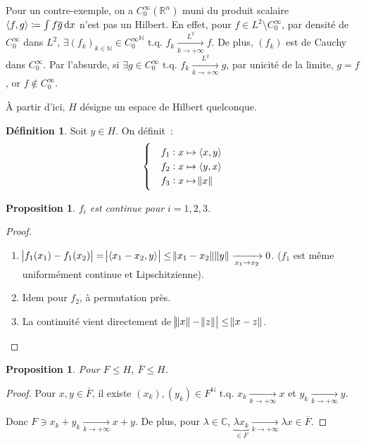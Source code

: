 \documentclass{report}
\newcommand{\C}{{\mathbb C}}
\newcommand{\R}{{\mathbb R}}
\newcommand{\N}{{\mathbb N}}
\newcommand{\scpr}[2]{\left\langle#1, #2\right\rangle}
\newcommand{\tq}{\text{ t.q. }}
\newcommand{\pinfty}{{+\infty}}
\newcommand{\dx}{\dif x}
\newtheorem{prp}[thm]{Proposition}
\theoremstyle{definition}
\newtheorem{déf}[thm]{Définition}
\theoremstyle{remark}
\begin{document}
Pour un contre-exemple, on a $C^\infty_0(\R^n)$ muni du produit scalaire $\scpr fg \coloneqq \int f\overline g\dx$ n'est pas un Hilbert. En effet, pour $f \in L^2 \setminus C^\infty_0$,
par densité de $C^\infty_0$ dans $L^2$, $\exists (f_k)_{k \in \N} \in {C^\infty_0}^\N \tq f_k \xrightarrow[k \to \pinfty]{L^2} f$. De plus, $(f_k)$ est de Cauchy dans $C^\infty_0$.
Par l'absurde, si $\exists g \in C^\infty_0 \tq f_k \xrightarrow[k \to \pinfty]{L^2} g$, par unicité de la limite, $g=f$, or $f \not \in C^\infty_0$.

À partir d'ici, $H$ désigne un espace de Hilbert quelconque.

\begin{déf} Soit $y \in H$. On définit~:
\[\begin{cases}
	&f_1 : x \mapsto \scpr xy \\
	&f_2 : x \mapsto \scpr yx \\
	&f_3 : x \mapsto \norm x
\end{cases}\]
\end{déf}

\begin{prp} $f_i$ est continue pour $i=1,2,3$.
\end{prp}

\begin{proof}
\begin{enumerate}
	\item $\abs {f_1(x_1) - f_1(x_2)} = \abs {\scpr {x_1-x_2}y} \leq \norm {x_1-x_2}\norm y \xrightarrow[x_1 \to x_2]{} 0$. ($f_1$ est même uniformément continue et Lipschitzienne).
	\item Idem pour $f_2$, à permutation près.
	\item La continuité vient directement de $\abs {\norm x-\norm z} \leq \norm {x-z}$.
\end{enumerate}
\end{proof}

\begin{prp} Pour $F \leq H$, $\overline F \leq H$.
\end{prp}

\begin{proof} Pour $x, y \in \overline F$, il existe $(x_k), (y_k) \in F^\N \tq x_k \xrightarrow[k \to \pinfty]{} x$ et $y_k \xrightarrow[k \to \pinfty]{} y$.

Donc $F \ni x_k+y_k \xrightarrow[k \to \pinfty]{} x+y$.
De plus, pour $\lambda \in \C$, $\underbrace {\lambda x_k}_{\in F} \xrightarrow[k \to \pinfty]{} \lambda x \in \overline F$.
\end{proof}
\end{document}
